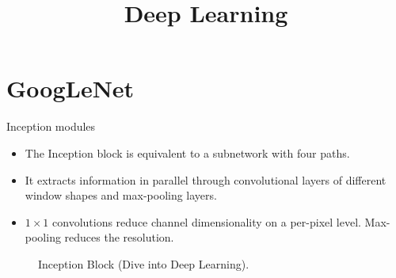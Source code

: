 





\newcommand{\titlefigure}{plots/moderncnn/residual-block.png}
\newcommand{\learninggoals}{
  \item GoogleNet
  \item ResNet
  \item DenseNet
  \item U-Net
}

\title{Deep Learning}
\date{}







\section{GoogLeNet}


\begin{vbframe}{Inception modules}
    \begin{itemize}
        \item The Inception block is equivalent to a subnetwork with four paths. 
        \item It extracts information in parallel through convolutional layers of different window shapes and max-pooling layers.  
        \item $1 \times 1$ convolutions reduce channel dimensionality on a per-pixel level. Max-pooling reduces the resolution.
    \end{itemize}
  \begin{figure}
    \centering
    \caption{Inception Block (Dive into Deep Learning).}
  \end{figure}
        \end{vbframe}



